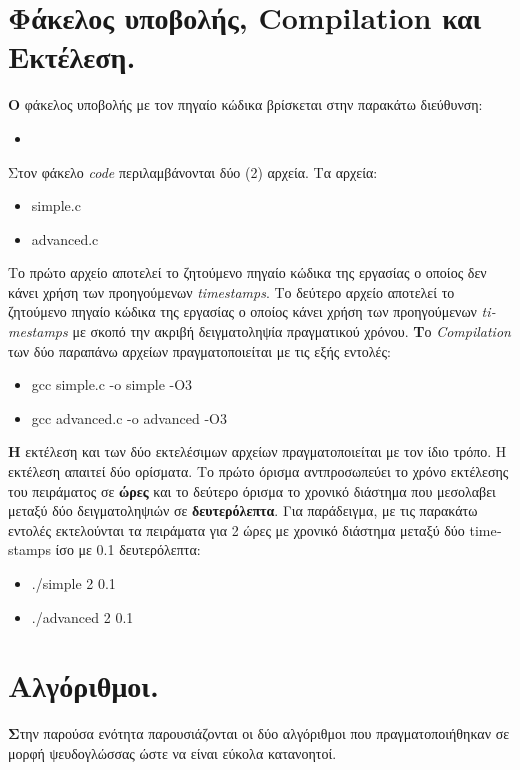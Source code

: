 \documentclass[12pt, a4paper]{article}
\begin{document}
\section{Φάκελος υποβολής, \textlatin{Compilation} και Εκτέλεση.}
\textbf{Ο} φάκελος υποβολής με τον πηγαίο κώδικα βρίσκεται στην παρακάτω διεύθυνση:
\begin{itemize}
  \item \textlatin{}
\end{itemize}
Στον φάκελο \textit{\textlatin{code}} περιλαμβάνονται δύο (2) αρχεία. Τα αρχεία:
\begin{itemize}
  \item \textlatin{simple.c}
  \item \textlatin{advanced.c}
\end{itemize}
\justify
Το πρώτο αρχείο αποτελεί το ζητούμενο πηγαίο κώδικα της εργασίας ο οποίος δεν κάνει χρήση των προηγούμενων
\textit{\textlatin{timestamps}}. Το δεύτερο αρχείο αποτελεί το ζητούμενο πηγαίο κώδικα της εργασίας ο οποίος κάνει χρήση των προηγούμενων \textit{\textlatin{timestamps}} με σκοπό την ακριβή δειγματοληψία πραγματικού χρόνου.
\justify
\textbf{Τ}ο \textit{\textlatin{Compilation}} των δύο παραπάνω αρχείων πραγματοποιείται με τις εξής εντολές:
\begin{itemize}
  \item \textlatin{gcc simple.c -o simple -O3}
  \item \textlatin{gcc advanced.c -o advanced -O3}
\end{itemize}

\justify
\textbf{Η} εκτέλεση και των δύο εκτελέσιμων αρχείων πραγματοποιείται με τον ίδιο τρόπο. Η εκτέλεση απαιτεί δύο ορίσματα. Το πρώτο όρισμα αντπροσωπεύει το χρόνο εκτέλεσης του πειράματος σε \textbf{ώρες} και το δεύτερο όρισμα το χρονικό διάστημα που μεσολαβει μεταξύ δύο δειγματοληψιών σε \textbf{δευτερόλεπτα}. Για παράδειγμα, με τις παρακάτω εντολές εκτελούνται τα πειράματα για 2 ώρες με χρονικό διάστημα μεταξύ δύο \textlatin{timestamps} ίσο με 0.1 δευτερόλεπτα:
\begin{itemize}
  \item \textlatin{./simple 2 0.1}
  \item \textlatin{./advanced 2 0.1}
\end{itemize}

\section{Αλγόριθμοι.}
\textbf{Σ}την παρούσα ενότητα παρουσιάζονται οι δύο αλγόριθμοι που πραγματοποιήθηκαν σε μορφή ψευδογλώσσας ώστε να είναι εύκολα κατανοητοί.
\end{document}
